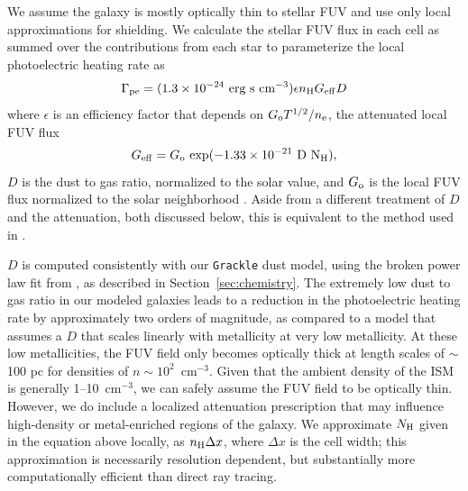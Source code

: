\documentclass[twocolumn]{aastex61}
\newcommand{\ccunit}{cm$^{-3}$}
\begin{document}

We assume the galaxy is mostly optically thin to stellar FUV and use only local approximations for shielding.  We calculate the stellar FUV flux in each cell as summed over the contributions from each star to parameterize the local photoelectric heating rate as \citep{BakesTielens1994,Wolfire2003,Bergin2004}
\begin{equation}
\label{eq:PE}
\Gamma_{\rm pe} = (1.3 \times 10^{-24} \mbox{~erg~s~cm}^{-3}) \epsilon n_{\rm H} G_{\rm eff} D 
\end{equation}
where $\epsilon$ is an efficiency factor that depends on $G_{\rm{o}} T^{1/2} /n_{\rm{e}}$, the attenuated local FUV flux \begin{equation} G_{\rm eff} = G_{\rm o}~\rm{exp}(-1.33\times10^{-21}~D~N_{\rm H}), \end{equation} $D$ is the dust to gas ratio, normalized to the solar value, and $G_{\rm o}$ is the local FUV flux normalized to the solar neighborhood \citep{Habing1968}. Aside from a different treatment of $D$ and the attenuation, both discussed below, this is equivalent to the method used in \citet{Hu2016,Hu2017}.

$D$ is computed consistently with our \texttt{Grackle} dust model, using the broken power law fit from \citet{Remy-Ruyer2014}, as described in Section~\ref{sec:chemistry}. The extremely low dust to gas ratio in our modeled galaxies leads to a reduction in the photoelectric heating rate by approximately two orders of magnitude, as compared to a model that assumes a $D$ that scales linearly with metallicity at very low metallicity. At these low metallicities, the FUV field only becomes optically thick at length scales of $\sim$ 100 pc for densities of $n \sim 10^2$~\ccunit. Given that the ambient density of the ISM is generally 1--10~cm$^{-3}$, we can safely assume the FUV field to be optically thin. However, we do include a localized attenuation prescription that may influence high-density or metal-enriched regions of the galaxy. We approximate $N_{\rm H}$ given in the equation above locally, as $n_{\rm H}\Delta x$, where $\Delta x$ is the cell width; this approximation is necessarily resolution dependent, but substantially more computationally efficient than direct ray tracing.
\end{document}
